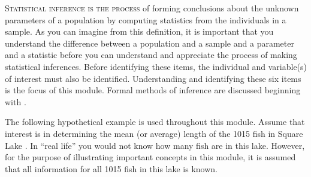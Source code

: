 \documentclass[10pt,openany]{book}\usepackage[]{graphicx}\usepackage[]{color}
\begin{document}
\minitoc
\newpage

\lettrine{S}{tatistical inference is the process} of forming conclusions about the unknown parameters of a population by computing statistics from the individuals in a sample.  As you can imagine from this definition, it is important that you understand the difference between a population and a sample and a parameter and a statistic before you can understand and appreciate the process of making statistical inferences.  Before identifying these items, the individual and variable(s) of interest must also be identified.  Understanding and identifying these six items is the focus of this module.  Formal methods of inference are discussed beginning with .


The following hypothetical example is used throughout this module.  Assume that interest is in determining the mean (or average) length of the 1015 fish in Square Lake . In ``real life'' you would not know how many fish are in this lake.  However, for the purpose of illustrating important concepts in this module, it is assumed that all information for all 1015 fish in this lake is known.
\end{document}
